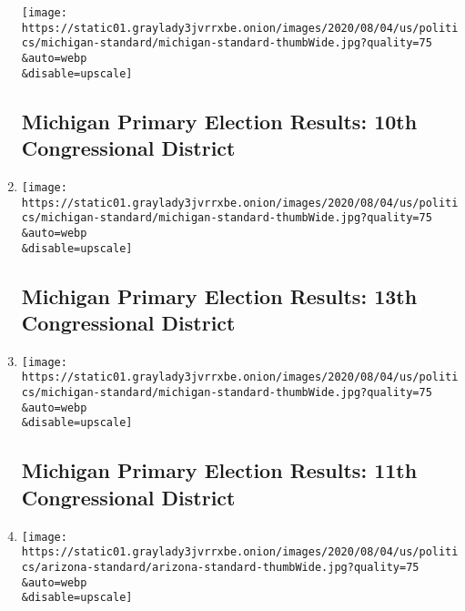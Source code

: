 \begin{enumerate}
  \texttt{[image: https://static01.graylady3jvrrxbe.onion/images/2020/08/04/us/politics/michigan-standard/michigan-standard-thumbWide.jpg?quality=75\\\&auto=webp\\\&disable=upscale]}

  \hypertarget{michigan-primary-election-results-10th-congressional-district}{%
  \subsection{Michigan Primary Election Results: 10th Congressional
  District}\label{michigan-primary-election-results-10th-congressional-district}}
\item
  \href{/interactive/2020/08/04/us/elections/results-michigan-house-district-13-primary-election.html}{}

  \texttt{[image: https://static01.graylady3jvrrxbe.onion/images/2020/08/04/us/politics/michigan-standard/michigan-standard-thumbWide.jpg?quality=75\\\&auto=webp\\\&disable=upscale]}

  \hypertarget{michigan-primary-election-results-13th-congressional-district}{%
  \subsection{Michigan Primary Election Results: 13th Congressional
  District}\label{michigan-primary-election-results-13th-congressional-district}}
\item
  \href{/interactive/2020/08/04/us/elections/results-michigan-house-district-11-primary-election.html}{}

  \texttt{[image: https://static01.graylady3jvrrxbe.onion/images/2020/08/04/us/politics/michigan-standard/michigan-standard-thumbWide.jpg?quality=75\\\&auto=webp\\\&disable=upscale]}

  \hypertarget{michigan-primary-election-results-11th-congressional-district}{%
  \subsection{Michigan Primary Election Results: 11th Congressional
  District}\label{michigan-primary-election-results-11th-congressional-district}}
\item
  \href{/interactive/2020/08/04/us/elections/results-arizona-house-district-2-primary-election.html}{}

  \texttt{[image: https://static01.graylady3jvrrxbe.onion/images/2020/08/04/us/politics/arizona-standard/arizona-standard-thumbWide.jpg?quality=75\\\&auto=webp\\\&disable=upscale]}


\end{enumerate}
